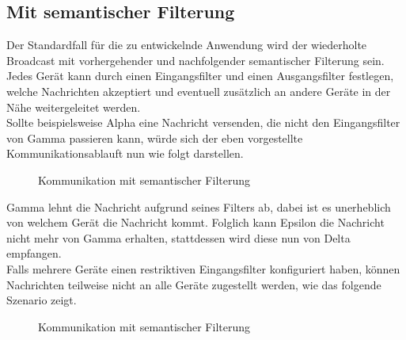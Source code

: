 \subsection{Mit semantischer Filterung}
Der Standardfall für die zu entwickelnde Anwendung wird der wiederholte Broadcast mit vorhergehender und nachfolgender semantischer Filterung sein. Jedes Gerät kann durch einen Eingangsfilter und einen Ausgangsfilter festlegen, welche Nachrichten akzeptiert und eventuell zusätzlich an andere Geräte in der Nähe weitergeleitet werden. 
\\Sollte beispielsweise Alpha eine Nachricht versenden, die nicht den Eingangsfilter von Gamma passieren kann, würde sich der eben vorgestellte Kommunikationsablauft nun wie folgt darstellen.
\begin{figure}[H]
	\centering
	\hspace*{1cm}
	\caption{Kommunikation mit semantischer Filterung}
	\label{fig:beispielszenario2}
\end{figure}
Gamma lehnt die Nachricht aufgrund seines Filters ab, dabei ist es unerheblich von welchem Gerät die Nachricht kommt. Folglich kann Epsilon die Nachricht nicht mehr von Gamma erhalten, stattdessen wird diese nun von Delta empfangen. 
\\Falls mehrere Geräte einen restriktiven Eingangsfilter konfiguriert haben, können Nachrichten teilweise nicht an alle Geräte zugestellt werden, wie das folgende Szenario zeigt.
\begin{figure}[H]
	\centering
	\hspace*{1cm}
	\caption{Kommunikation mit semantischer Filterung}
	\label{fig:beispielszenario3}
\end{figure}
